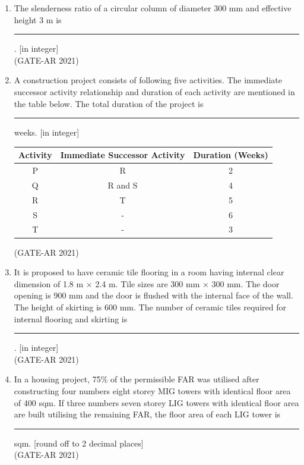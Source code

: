 \documentclass[a4paper,10pt]{article}
\begin{document}
\begin{enumerate}
    \item The slenderness ratio of a circular column of diameter 300 mm and effective height 3 m is \rule{2cm}{0.4pt}. [in integer] \\
    \hfill (GATE-AR 2021)

    \item A construction project consists of following five activities. The immediate successor activity relationship and duration of each activity are mentioned in the table below. The total duration of the project is \rule{2cm}{0.4pt} weeks. [in integer] \\
    \begin{tabular}{ | c | c | c | }
    \hline
    Activity & Immediate Successor Activity & Duration (Weeks) \\
    \hline
    P & R & 2 \\
    \hline
    Q & R and S & 4 \\
    \hline
    R & T & 5 \\
    \hline
    S & - & 6 \\
    \hline
    T & - & 3 \\
    \hline
    \end{tabular}
    \hfill (GATE-AR 2021)

    \item It is proposed to have ceramic tile flooring in a room having internal clear dimension of 1.8 m $\times$ 2.4 m. Tile sizes are 300 mm $\times$ 300 mm. The door opening is 900 mm and the door is flushed with the internal face of the wall. The height of skirting is 600 mm. The number of ceramic tiles required for internal flooring and skirting is \rule{2cm}{0.4pt}. [in integer] \\
    \hfill (GATE-AR 2021)

    \item In a housing project, 75\% of the permissible FAR was utilised after constructing four numbers eight storey MIG towers with identical floor area of 400 sqm. If three numbers seven storey LIG towers with identical floor area are built utilising the remaining FAR, the floor area of each LIG tower is \rule{2cm}{0.4pt} sqm. [round off to 2 decimal places] \\
    \hfill (GATE-AR 2021)


\end{enumerate}
\end{document}
